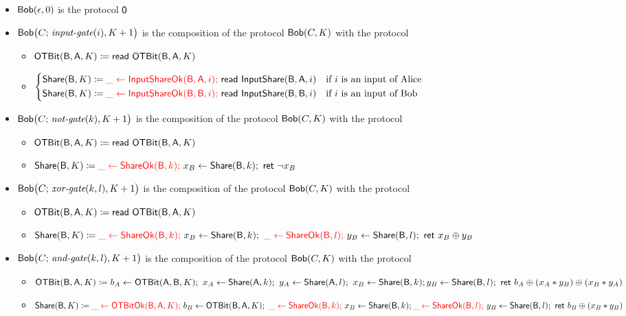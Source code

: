 \begin{itemize}
\item $\mathsf{Bob}(\epsilon,0)$ is the protocol $\mathsf{0}$
\item $\mathsf{Bob}\big(C; \, \textit{input-gate}(i),K+1\big)$ is the composition of the protocol $\mathsf{Bob}(C,K)$ with the protocol
\begin{itemize}
\item $\mathsf{OTBit}(\mathsf{B},\mathsf{A},K) \coloneqq \mathsf{read} \ \mathsf{OTBit}(\mathsf{B},\mathsf{A},K)$
\item $\begin{cases*} \Share(\B,K) \coloneqq {\color{red} \_ \leftarrow \InputShareOk(\B,\A,i); \ } \read{\InputShare(\B,\A,i)} & \text{if $i$ is an input of Alice} \\ \Share(\B,K) \coloneqq {\color{red} \_ \leftarrow \InputShareOk(\B,\B,i); \ } \read{\InputShare(\B,\B,i)} & \text{if $i$ is an input of Bob} \end{cases*}$
\end{itemize}
\item $\mathsf{Bob}\big(C; \, \textit{not-gate}(k),K+1\big)$ is the composition of the protocol $\mathsf{Bob}(C,K)$ with the protocol
\begin{itemize}
\item $\mathsf{OTBit}(\mathsf{B},\mathsf{A},K) \coloneqq \mathsf{read} \ \mathsf{OTBit}(\mathsf{B},\mathsf{A},K)$
\item $\mathsf{Share}(\mathsf{B},K) \coloneqq {\color{red} \_ \leftarrow \mathsf{ShareOk}(\mathsf{B},k); \ } x_B \leftarrow \mathsf{Share}(\mathsf{B},k); \ \mathsf{ret} \ \neg x_B$
\end{itemize}
\item $\mathsf{Bob}\big(C; \, \textit{xor-gate}(k,l),K+1\big)$ is the composition of the protocol $\mathsf{Bob}(C,K)$ with the protocol
\begin{itemize}
\item $\mathsf{OTBit}(\mathsf{B},\mathsf{A},K) \coloneqq \mathsf{read} \ \mathsf{OTBit}(\mathsf{B},\mathsf{A},K)$
\item $\Share(\B,K) \coloneqq {\color{red} \_ \leftarrow \ShareOk(\B,k); \ } x_B \leftarrow \Share(\B,k); \ {\color{red} \_ \leftarrow \ShareOk(\B,l); \ } y_B \leftarrow \Share(\B,l); \ \ret{x_B \oplus y_B}$
\end{itemize}
\item $\mathsf{Bob}\big(C; \, \textit{and-gate}(k,l),K+1\big)$ is the composition of the protocol $\mathsf{Bob}(C,K)$ with the protocol
\begin{itemize}
\item $\mathsf{OTBit}(\mathsf{B},\mathsf{A},K) \coloneqq b_A \leftarrow \mathsf{OTBit}(\mathsf{A},\mathsf{B},K); \ x_A \leftarrow \mathsf{Share}(\mathsf{A},k); \ y_A \leftarrow \mathsf{Share}(\mathsf{A},l); \ x_B \leftarrow \mathsf{Share}(\mathsf{B},k); \\ y_B \leftarrow \mathsf{Share}(\mathsf{B},l); \ \mathsf{ret} \ b_A \oplus (x_A * y_B) \oplus (x_B * y_A)$
\item $\Share(\B,K) \coloneqq {\color{red} \_ \leftarrow \OTBitOk(\B,\A,K); \ } b_B \leftarrow \OTBit(\B,\A,K); \ {\color{red} \_ \leftarrow \ShareOk(\B,k); \ } x_B \leftarrow \Share(\B,k); \\ {\color{red} \_ \leftarrow \ShareOk(\B,l); \ } y_B \leftarrow \Share(\B,l); \ \ret{b_B \oplus (x_B * y_B)}$
\end{itemize}
\end{itemize}

